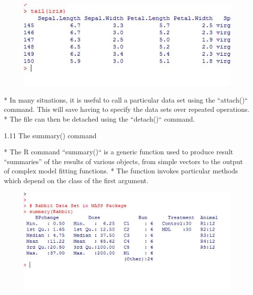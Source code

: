 \documentclass{beamer}
\begin{document}

\begin{figure}
\centering
\includegraphics[width=1.2\linewidth]{images/iristail}     
\end{figure}
   


* In many situations, it is useful to call a particular data set using the ``attach()`` command. This
will save having to specify the data sets over repeated operations. 
* The file can then be detached
using the ``detach()`` command.






{1.11 The summary() command}


* The R command ``summary()`` is a generic function used to produce result “summaries” of the
results of various objects, from simple vectors to the output of complex model fitting functions.
* The function invokes particular methods which depend on the class of the first argument.



\begin{figure}
\centering
\includegraphics[width=1.2\linewidth]{images/rabbitsummary}   
\end{figure}
 

\end{document}
